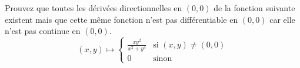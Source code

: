 
\begin{exercice}\label{exo0046}

Prouvez que toutes les dérivées directionnelles en $(0,0)$ de la fonction suivante existent mais que cette même fonction n'est pas différentiable en $(0,0)$ car elle n'est pas continue en $(0,0)$.
\begin{equation}
	(x,y)\mapsto\begin{cases}
	\frac{ xy^2 }{ x^2+y^4 }	&	\text{si $(x,y)\neq(0,0)$}\\
	0	&	 \text{sinon}
\end{cases}
\end{equation}

\end{exercice}
